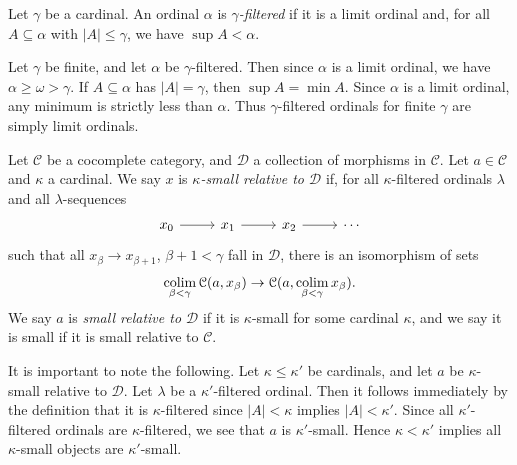 \begin{definition}\label{3.1.2}
	Let $\gamma $ be a cardinal. An ordinal $\alpha $ is \emph{$\gamma $-filtered} if it is a limit ordinal and, for all $A\subseteq \alpha $ with $\left| A \right| \leq \gamma $, we have $\sup A < \alpha $.
\end{definition}

\begin{remark}\label{3.1.3}
	Let $\gamma $ be finite, and let $\alpha $ be $\gamma $-filtered. Then since $\alpha $ is a limit ordinal, we have $\alpha \geq \omega >\gamma $. If $A\subseteq \alpha $ has $\left| A \right| =\gamma $, then $\sup A = \min A$. Since $\alpha $ is a limit ordinal, any minimum is strictly less than $\alpha $. Thus $\gamma $-filtered ordinals for finite $\gamma $ are simply limit ordinals.
\end{remark}

\begin{definition}\label{3.1.4}
	Let $\mathcal{C} $ be a cocomplete category, and $\mathcal{D} $ a collection of morphisms in $\mathcal{C} $. Let $a\in \mathcal{C} $ and $\kappa $ a cardinal. We say $x$ is \emph{$\kappa $-small relative to $\mathcal{D} $} if, for all $\kappa $-filtered ordinals $\lambda $ and all $\lambda $-sequences
	\[\begin{tikzcd}[row sep = 2.5em, column sep = 2.5em]
	x_0\ar[r]  & x_1\ar[r]  & x_2\ar[r]  & \cdots 
	\end{tikzcd}\]
	such that all $x_\beta \to x_{\beta +1} $, $\beta +1<\gamma $ fall in $\mathcal{D} $, there is an isomorphism of sets
	\[
		\operatorname*{colim}_{\beta <\gamma } \mathcal{C} (a,x_\beta ) \to \mathcal{C} (a, \operatorname*{colim}_{\beta <\gamma } x_\beta )
	.\]
	We say $a$ is \emph{small relative to $\mathcal{D} $} if it is $\kappa $-small for some cardinal $\kappa $, and we say it is small if it is small relative to $\mathcal{C} $.
\end{definition}

\begin{remark}\label{4.1.5}
	It is important to note the following. Let $\kappa \leq \kappa '$ be cardinals, and let $a$ be $\kappa $-small relative to $\mathcal{D} $. Let $\lambda$ be a $\kappa '$-filtered ordinal. Then it follows immediately by the definition that it is $\kappa $-filtered since $\left| A \right| < \kappa $ implies $\left| A \right| <\kappa '$. Since all $\kappa '$-filtered ordinals are $\kappa $-filtered, we see that $a$ is $\kappa'$-small. Hence $\kappa <\kappa '$ implies all $\kappa $-small objects are $\kappa '$-small.
\end{remark}

